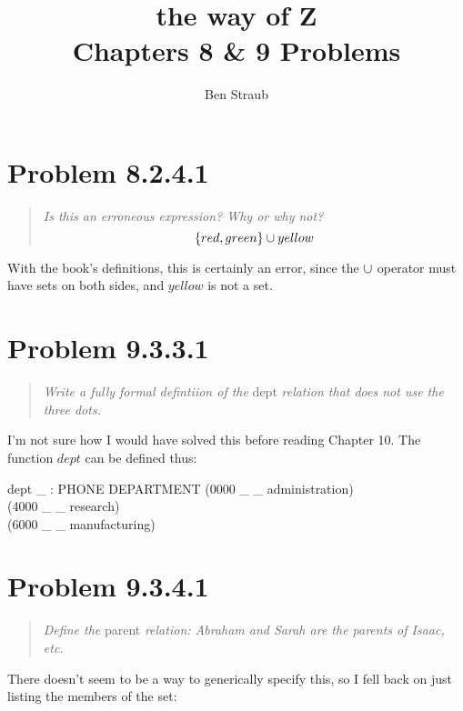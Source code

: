 \documentclass[10pt]{article}
\begin{document}
\title{the way of Z \\ Chapters 8 \& 9 Problems}
\author{Ben Straub}
\maketitle


\section{Problem 8.2.4.1}
\begin{quote}
  {\it
    Is this an erroneous expression?  Why or why not?
    \[ \{red, green\} \cup yellow \]
  }
\end{quote}
With the book's definitions, this is certainly an error, since the $\cup$ operator must have sets
on both sides, and $yellow$ is not a set.



\section{Problem 9.3.3.1}
\begin{quote}
  {\it Write a fully formal defintiion of the} dept {\it relation that does not use the three dots.}
\end{quote}

I'm not sure how I would have solved this before reading Chapter 10.  The function $dept$ can be
defined thus:

\begin{axdef}
  dept \_ : PHONE \rel DEPARTMENT
  \where
  (0000 \leq \_  \land \_ \mapsto administration) \lor \\
  (4000 \leq \_  \land \_ \mapsto research) \lor \\
  (6000 \leq \_  \land \_ \mapsto manufacturing)
\end{axdef}


\section{Problem 9.3.4.1}
\begin{quote}
  {\it Define the} parent {\it relation: Abraham and Sarah are the parents of Isaac, etc.}

\end{quote}

There doesn't seem to be a way to generically specify this, so I fell back on just listing the
members of the set:
\end{document}
